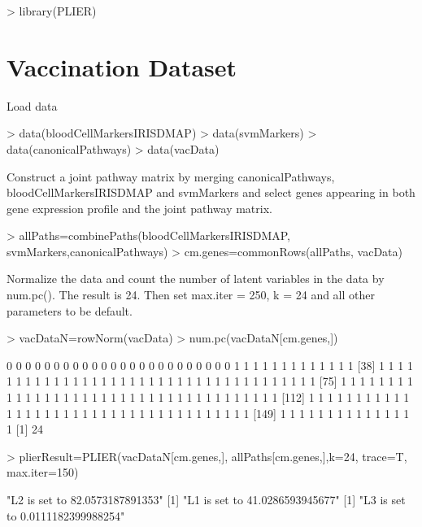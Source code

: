 \documentclass{article}
\begin{document}

\begin{Schunk}
\begin{Sinput}
> library(PLIER)
\end{Sinput}
\end{Schunk}
\section{Vaccination Dataset}
Load data
\begin{Schunk}
\begin{Sinput}
> data(bloodCellMarkersIRISDMAP)
> data(svmMarkers)
> data(canonicalPathways)
> data(vacData)
\end{Sinput}
\end{Schunk}
Construct a joint pathway matrix by merging canonicalPathways, bloodCellMarkersIRISDMAP and svmMarkers and select genes appearing in both gene expression profile and the joint pathway matrix.
\begin{Schunk}
\begin{Sinput}
> allPaths=combinePaths(bloodCellMarkersIRISDMAP, svmMarkers,canonicalPathways)
> cm.genes=commonRows(allPaths, vacData)
\end{Sinput}
\end{Schunk}
Normalize the data and count the number of latent variables in the data by num.pc(). The result is 24. Then set max.iter = 250, k = 24 and all other parameters to be default.
\begin{Schunk}
\begin{Sinput}
> vacDataN=rowNorm(vacData)
> num.pc(vacDataN[cm.genes,])
\end{Sinput}
\begin{Soutput}
  [1] 0 0 0 0 0 0 0 0 0 0 0 0 0 0 0 0 0 0 0 0 0 0 0 0 1 1 1 1 1 1 1 1 1 1 1 1 1
 [38] 1 1 1 1 1 1 1 1 1 1 1 1 1 1 1 1 1 1 1 1 1 1 1 1 1 1 1 1 1 1 1 1 1 1 1 1 1
 [75] 1 1 1 1 1 1 1 1 1 1 1 1 1 1 1 1 1 1 1 1 1 1 1 1 1 1 1 1 1 1 1 1 1 1 1 1 1
[112] 1 1 1 1 1 1 1 1 1 1 1 1 1 1 1 1 1 1 1 1 1 1 1 1 1 1 1 1 1 1 1 1 1 1 1 1 1
[149] 1 1 1 1 1 1 1 1 1 1 1 1 1 1 1
[1] 24
\end{Soutput}
\begin{Sinput}
> plierResult=PLIER(vacDataN[cm.genes,], allPaths[cm.genes,],k=24, trace=T, max.iter=150)
\end{Sinput}
\begin{Soutput}
[1] "L2 is set to 82.0573187891353"
[1] "L1 is set to 41.0286593945677"
[1] "L3 is set to 0.0111182399988254"
\end{Soutput}
\end{Schunk}
\end{document}
